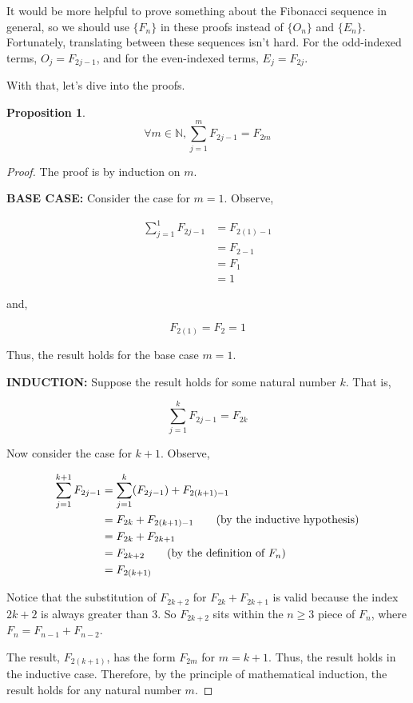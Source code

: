 \documentclass{article} %
\newtheorem{proposition}{Proposition}
\newcommand{\emptyline}{\vspace{\baselineskip}}
\begin{document}
It would be more helpful to prove something about the Fibonacci sequence in general, so we should use $\{F_n\}$ in these proofs instead of $\{O_n\}$ and $\{E_n\}$.
Fortunately, translating between these sequences isn't hard.
For the odd-indexed terms, $O_j = F_{2j-1}$, and
for the even-indexed terms, $E_j = F_{2j}$.

With that, let's dive into the proofs.

\begin{proposition}
  \[
    \forall m \in \mathbb{N}, \sum_{j=1}^{m} F_{2j-1} = F_{2m}
  \]
\end{proposition}

\begin{proof} The proof is by induction on $m$.

  \emptyline

  \textbf{BASE CASE:} Consider the case for $m=1$. Observe,

  \[\begin{aligned}
    \sum_{j=1}^1 F_{2j-1} &= F_{2(1)-1} \\
                          &= F_{2-1} \\
                          &= F_1 \\
                          &= 1
  \end{aligned}\]

  and,

  \[
    F_{2(1)} = F_2 = 1
  \]

  Thus, the result holds for the base case $m=1$.

  \emptyline

  \textbf{INDUCTION:} Suppose the result holds for some natural number $k$. That is,

  \[
    \sum_{j=1}^{k} F_{2j-1} = F_{2k}
  \]

  Now consider the case for $k+1$. Observe,

  \begin{align}
    \sum_{j=1}^{k+1} F_{2j-1} &= \sum_{j=1}^k (F_{2j-1}) + F_{2(k+1)-1} \notag \\
                    &= F_{2k} + F_{2(k+1)-1} \tag{by the inductive hypothesis} \\
                    &= F_{2k} + F_{2k+1} \notag \\
                    &= F_{2k+2} \tag{by the definition of $F_n$} \\
                    &= F_{2(k+1)} \notag
  \end{align}

  Notice that the substitution of $F_{2k+2}$ for $F_{2k} + F_{2k+1}$ is valid because the index $2k+2$ is always greater than 3. So $F_{2k+2}$ sits within the $n \ge 3$ piece of $F_n$, where $F_n = F_{n-1} + F_{n-2}$.

  The result, $F_{2(k+1)}$, has the form $F_{2m}$ for $m = k+1$. Thus, the result holds in the inductive case. Therefore, by the principle of mathematical induction, the result holds for any natural number $m$.

\end{proof}
\end{document}
